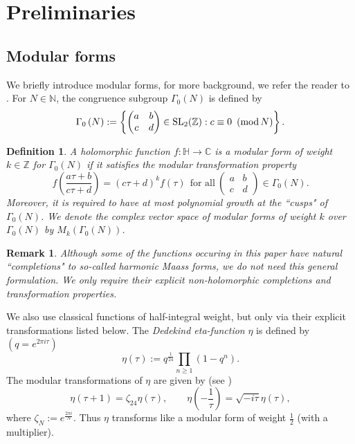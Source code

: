 \documentclass[12pt,reqno]{amsart}
\newcommand{\G}{\Gamma}
\renewcommand{\t}{\tau}
\newcommand{\z}{\zeta}
\renewcommand{\(}{\left\(}
\renewcommand{\)}{\right\)}
\numberwithin{equation}{section}
\theoremstyle{plain}
\theoremstyle{definition}
\newtheorem*{definition}{Definition}
\newtheorem*{remark}{Remark}
\numberwithin{equation}{section}
\renewcommand{\pmod}[1]{\ \left( \mathrm{mod} \, #1 \right)}
\begin{document}
\section{Preliminaries}\label{sec1}


\subsection{Modular forms} We briefly introduce modular forms, for more background, we refer the reader to \cite{Ono}. For $N\in \mathbb{N}$, the congruence subgroup $\G_0(N)$ is defined by
 \[
 \G_0\left(N\right):=\left\{\begin{pmatrix}
 a&b\\
 c&d
 \end{pmatrix}\in \textnormal{SL}_2(\mathbb{Z}): c\equiv 0\pmod{N}\right\}.
 \]
 \begin{definition}
 	{\it A holomorphic function $f:\mathbb{H}\rightarrow \mathbb{C}$ is a {\it modular form} of weight $k\in \mathbb{Z}$ for $\G_0(N)$ if it satisfies the {\it modular transformation property} 
 	\begin{equation}\label{transform}
 	f\left(\frac{a\t+b}{c\t+d}\right)=\left(c\t+d\right)^k f(\t)\ \ \text{for all}\ \begin{pmatrix}
 	a&b\\
 	c&d
 	\end{pmatrix}\in \G_0(N).%
 	\end{equation}
 Moreover, it is required to have at most polynomial growth at the ``cusps" of $\G_0(N)$. We denote the complex vector space of modular forms of weight $k$ over $\G_0(N)$ by $M_k(\G_0(N))$.}
 \end{definition}

\begin{remark}
{\it Although some of the functions occuring in this paper have natural ``completions" to so-called harmonic Maass forms, we do not need this general formulation. We only require their explicit non-holomorphic completions and transformation properties.}
\end{remark}

We also use classical functions of half-integral weight, but only via their explicit transformations listed below. The {\it Dedekind eta-function} $\eta$ is defined by $(q=e^{2\pi i\t})$ \[\eta\left(\tau\right):=q^{\frac{1}{24}}\prod_{n\ge 1}\left(1-q^n\right).\]
The modular transformations %
of $\eta$ are given by (see \cite[Theorem 1.61]{Ono})
\begin{equation}\label{eta}
\eta(\t+1)=\z_{24}\eta(\t),\qquad \eta\left(-\frac{1}{\t}\right)=\sqrt{-i\t}\eta(\t),
\end{equation}
where $\z_N:=e^{\frac{2\pi i}{N}}$. Thus $\eta$ transforms like a modular form of weight $\frac 12$ (with a multiplier).
\end{document}
